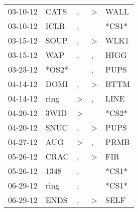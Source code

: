 \begin{supertabular}{p{0.07\textwidth}p{0.06\textwidth}p{0.02\textwidth}p{0.02\textwidth}p{0.06\textwidth}}
          03-10-12\textsuperscript{} &           CATS\textsuperscript{} &                , &     \textgreater &           WALL\textsuperscript{} \\
          03-10-12\textsuperscript{} &           ICLR\textsuperscript{} &                , &                  &                            *CS1* \\
          03-15-12\textsuperscript{} &           SOUP\textsuperscript{} &                , &     \textgreater &           WLK1\textsuperscript{} \\
          03-15-12\textsuperscript{} &            WAP\textsuperscript{} &                , &                , &           HIGG\textsuperscript{} \\
          03-23-12\textsuperscript{} &                            *OS2* &                  &                , &           PUPS\textsuperscript{} \\
          04-14-12\textsuperscript{} &           DOMI\textsuperscript{} &                , &     \textgreater &           BTTM\textsuperscript{} \\
          04-14-12\textsuperscript{} &           ring\textsuperscript{} &     \textgreater &                , &           LINE\textsuperscript{} \\
          04-20-12\textsuperscript{} &           3WID\textsuperscript{} &     \textgreater &                  &                            *CS2* \\
          04-20-12\textsuperscript{} &           SNUC\textsuperscript{} &                , &     \textgreater &           PUPS\textsuperscript{} \\
          04-27-12\textsuperscript{} &            AUG\textsuperscript{} &     \textgreater &                , &           PRMB\textsuperscript{} \\
          05-26-12\textsuperscript{} &           CRAC\textsuperscript{} &                , &     \textgreater &            FIR\textsuperscript{} \\
          05-26-12\textsuperscript{} &           1348\textsuperscript{} &                , &                  &                            *CS1* \\
          06-29-12\textsuperscript{} &           ring\textsuperscript{} &                , &                  &                            *CS1* \\
          06-29-12\textsuperscript{} &           ENDS\textsuperscript{} &                , &     \textgreater &           SELF\textsuperscript{} \\

\end{supertabular}
